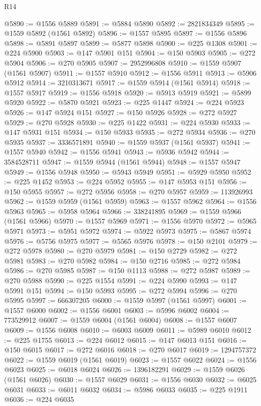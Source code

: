 \begin{lexlean}{R14}
\begin{coremodule}
@5890 := @1556 @5889
@5891 := @5884 @5890
@5892 := 2821834349
@5895 := @1559 @5892 (@1561 @5892)
@5896 := @1557 @5895
@5897 := @1556 @5896
@5898 := @5891 @5897
@5899 := @5877 @5898
@5900 := @225 @1308
@5901 := @224 @5900
@5903 := @147 @5901 @151
@5904 := @150 @5903
@5905 := @272 @5904
@5906 := @270 @5905
@5907 := 2952996808
@5910 := @1559 @5907 (@1561 @5907)
@5911 := @1557 @5910
@5912 := @1556 @5911
@5913 := @5906 @5912
@5914 := 3210313671
@5917 := @1559 @5914 (@1561 @5914)
@5918 := @1557 @5917
@5919 := @1556 @5918
@5920 := @5913 @5919
@5921 := @5899 @5920
@5922 := @5870 @5921
@5923 := @225 @1447
@5924 := @224 @5923
@5926 := @147 @5924 @151
@5927 := @150 @5926
@5928 := @272 @5927
@5929 := @270 @5928
@5930 := @225 @1422
@5931 := @224 @5930
@5933 := @147 @5931 @151
@5934 := @150 @5933
@5935 := @272 @5934
@5936 := @270 @5935
@5937 := 3336571891
@5940 := @1559 @5937 (@1561 @5937)
@5941 := @1557 @5940
@5942 := @1556 @5941
@5943 := @5936 @5942
@5944 := 3584528711
@5947 := @1559 @5944 (@1561 @5944)
@5948 := @1557 @5947
@5949 := @1556 @5948
@5950 := @5943 @5949
@5951 := @5929 @5950
@5952 := @225 @1452
@5953 := @224 @5952
@5955 := @147 @5953 @151
@5956 := @150 @5955
@5957 := @272 @5956
@5958 := @270 @5957
@5959 := 113926993
@5962 := @1559 @5959 (@1561 @5959)
@5963 := @1557 @5962
@5964 := @1556 @5963
@5965 := @5958 @5964
@5966 := 338241895
@5969 := @1559 @5966 (@1561 @5966)
@5970 := @1557 @5969
@5971 := @1556 @5970
@5972 := @5965 @5971
@5973 := @5951 @5972
@5974 := @5922 @5973
@5975 := @5867 @5974
@5976 := @5756 @5975
@5977 := @5565 @5976
@5978 := @150 @2101
@5979 := @272 @5978
@5980 := @270 @5979
@5981 := @150 @2729
@5982 := @272 @5981
@5983 := @270 @5982
@5984 := @150 @2716
@5985 := @272 @5984
@5986 := @270 @5985
@5987 := @150 @1113
@5988 := @272 @5987
@5989 := @270 @5988
@5990 := @225 @1554
@5991 := @224 @5990
@5993 := @147 @5991 @151
@5994 := @150 @5993
@5995 := @272 @5994
@5996 := @270 @5995
@5997 := 666307205
@6000 := @1559 @5997 (@1561 @5997)
@6001 := @1557 @6000
@6002 := @1556 @6001
@6003 := @5996 @6002
@6004 := 773529912
@6007 := @1559 @6004 (@1561 @6004)
@6008 := @1557 @6007
@6009 := @1556 @6008
@6010 := @6003 @6009
@6011 := @5989 @6010
@6012 := @225 @1755
@6013 := @224 @6012
@6015 := @147 @6013 @151
@6016 := @150 @6015
@6017 := @272 @6016
@6018 := @270 @6017
@6019 := 1294757372
@6022 := @1559 @6019 (@1561 @6019)
@6023 := @1557 @6022
@6024 := @1556 @6023
@6025 := @6018 @6024
@6026 := 1396182291
@6029 := @1559 @6026 (@1561 @6026)
@6030 := @1557 @6029
@6031 := @1556 @6030
@6032 := @6025 @6031
@6033 := @6011 @6032
@6034 := @5986 @6033
@6035 := @225 @1911
@6036 := @224 @6035

\end{coremodule}
\end{lexlean}
